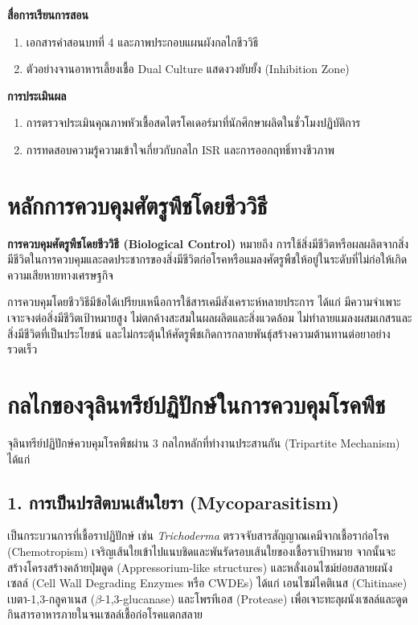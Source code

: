 \noindent\textbf{สื่อการเรียนการสอน}
\begin{enumerate}
    \item เอกสารคำสอนบทที่ 4 และภาพประกอบแผนผังกลไกชีววิธี
    \item ตัวอย่างจานอาหารเลี้ยงเชื้อ Dual Culture แสดงวงยับยั้ง (Inhibition Zone)
\end{enumerate}

\noindent\textbf{การประเมินผล}
\begin{enumerate}
    \item การตรวจประเมินคุณภาพหัวเชื้อสดไตรโคเดอร์มาที่นักศึกษาผลิตในชั่วโมงปฏิบัติการ
    \item การทดสอบความรู้ความเข้าใจเกี่ยวกับกลไก ISR และการออกฤทธิ์ทางชีวภาพ
\end{enumerate}

\newpage


\section{หลักการควบคุมศัตรูพืชโดยชีววิธี}

\textbf{การควบคุมศัตรูพืชโดยชีววิธี (Biological Control)} หมายถึง การใช้สิ่งมีชีวิตหรือผลผลิตจากสิ่งมีชีวิตในการควบคุมและลดประชากรของสิ่งมีชีวิตก่อโรคหรือแมลงศัตรูพืชให้อยู่ในระดับที่ไม่ก่อให้เกิดความเสียหายทางเศรษฐกิจ

การควบคุมโดยชีววิธีมีข้อได้เปรียบเหนือการใช้สารเคมีสังเคราะห์หลายประการ ได้แก่ มีความจำเพาะเจาะจงต่อสิ่งมีชีวิตเป้าหมายสูง ไม่ตกค้างสะสมในผลผลิตและสิ่งแวดล้อม ไม่ทำลายแมลงผสมเกสรและสิ่งมีชีวิตที่เป็นประโยชน์ และไม่กระตุ้นให้ศัตรูพืชเกิดการกลายพันธุ์สร้างความต้านทานต่อยาอย่างรวดเร็ว

\section{กลไกของจุลินทรีย์ปฏิปักษ์ในการควบคุมโรคพืช}

จุลินทรีย์ปฏิปักษ์ควบคุมโรคพืชผ่าน 3 กลไกหลักที่ทำงานประสานกัน (Tripartite Mechanism) ได้แก่

\subsection{1. การเป็นปรสิตบนเส้นใยรา (Mycoparasitism)}
เป็นกระบวนการที่เชื้อราปฏิปักษ์ เช่น \textit{Trichoderma} ตรวจจับสารสัญญาณเคมีจากเชื้อราก่อโรค (Chemotropism) เจริญเส้นใยเข้าไปแนบชิดและพันรัดรอบเส้นใยของเชื้อราเป้าหมาย จากนั้นจะสร้างโครงสร้างคล้ายปุ่มดูด (Appressorium-like structures) และหลั่งเอนไซม์ย่อยสลายผนังเซลล์ (Cell Wall Degrading Enzymes หรือ CWDEs) ได้แก่ เอนไซม์ไคติเนส (Chitinase) เบตา-1,3-กลูคาเนส ($\beta$-1,3-glucanase) และโพรทีเอส (Protease) เพื่อเจาะทะลุผนังเซลล์และดูดกินสารอาหารภายในจนเซลล์เชื้อก่อโรคแตกสลาย

